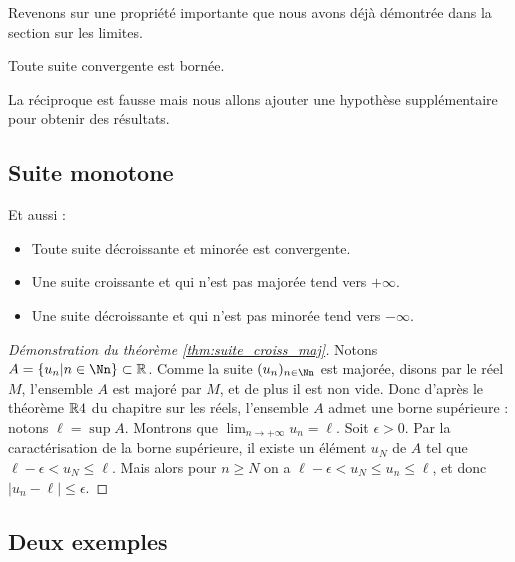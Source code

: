 \documentclass[class=report,crop=false]{standalone}
\begin{document}
Revenons sur une propriété importante que nous avons déjà démontrée dans la section sur les limites.
\begin{proposition}
Toute suite convergente est bornée.
\end{proposition}

La réciproque est fausse mais nous allons ajouter une
hypothèse supplémentaire pour obtenir des résultats.


\subsection{Suite monotone}

\begin{theoreme}
\label{thm:suite_croiss_maj}
\sauteligne
{}
\end{theoreme}

\begin{remarque*}
  Et aussi :
  \begin{itemize}
    \item Toute suite décroissante et minorée est convergente.
    \item Une suite croissante et qui n'est pas majorée tend vers $+\infty$.
    \item Une suite décroissante et qui n'est pas minorée tend vers $-\infty$.
  \end{itemize}
\end{remarque*}

\begin{proof}[Démonstration du théorème \ref{thm:suite_croiss_maj}]
Notons $A=\left\{ u_n| n\in \Nn\right\} \subset \Rr$. Comme la suite $(u_n)_{n\in \Nn}$
est majorée, disons par le réel $M$, l'ensemble $A$ est majoré par $M$, et de plus
 il est non vide. Donc d'après le théorème $\mathbb{R}4$ du chapitre sur les réels,
l'ensemble $A$ admet une borne supérieure : notons $\ell=\sup A$. Montrons que
$\lim_{n\to +\infty} u_n=\ell$. Soit $\epsilon >0$. Par la caractérisation
de la borne supérieure, il existe un élément $u_N$ de $A$ tel que
 $\ell-\epsilon < u_N \leq \ell$. Mais alors pour $n\geq N$ on a $\ell-\epsilon < u_N \leq u_n \leq \ell$,
et donc $\lvert u_n-\ell \rvert \leq \epsilon$.
\end{proof}



\subsection{Deux exemples}
\end{document}

